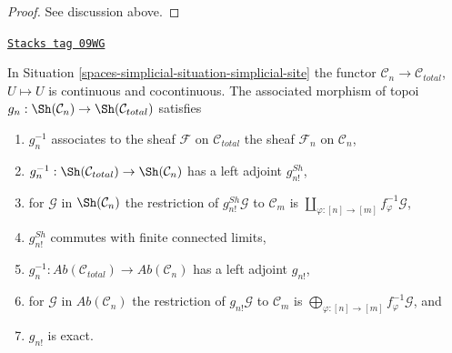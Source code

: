 \begin{proof}
See discussion above.
\end{proof}

\begin{lemma}
\label{spaces-simplicial-lemma-restriction-to-components-site}
\href{https://stacks.math.columbia.edu/tag/09WG}{\texttt{Stacks tag 09WG}}

In Situation \ref{spaces-simplicial-situation-simplicial-site} the functor
$\mathcal{C}_n \to \mathcal{C}_{total}$, $U \mapsto U$ is continuous
and cocontinuous. The associated morphism of
topoi $g_n : \Sh(\mathcal{C}_n) \to \Sh(\mathcal{C}_{total})$ satisfies
\begin{enumerate}
\item $g_n^{-1}$ associates to the sheaf $\mathcal{F}$ on $\mathcal{C}_{total}$
the sheaf $\mathcal{F}_n$ on $\mathcal{C}_n$,
\item $g_n^{-1} : \Sh(\mathcal{C}_{total}) \to \Sh(\mathcal{C}_n)$
has a left adjoint $g^{Sh}_{n!}$,
\item for $\mathcal{G}$ in $\Sh(\mathcal{C}_n)$ the restriction of
$g_{n!}^{Sh}\mathcal{G}$ to $\mathcal{C}_m$ is
$\coprod\nolimits_{\varphi : [n] \to [m]} f_\varphi^{-1}\mathcal{G}$,
\item $g_{n!}^{Sh}$ commutes with finite connected limits,
\item $g_n^{-1} : \textit{Ab}(\mathcal{C}_{total}) \to
\textit{Ab}(\mathcal{C}_n)$ has a left adjoint $g_{n!}$,
\item for $\mathcal{G}$ in $\textit{Ab}(\mathcal{C}_n)$ the restriction of
$g_{n!}\mathcal{G}$ to $\mathcal{C}_m$ is
$\bigoplus\nolimits_{\varphi : [n] \to [m]} f_\varphi^{-1}\mathcal{G}$, and
\item $g_{n!}$ is exact.
\end{enumerate}
\end{lemma}

